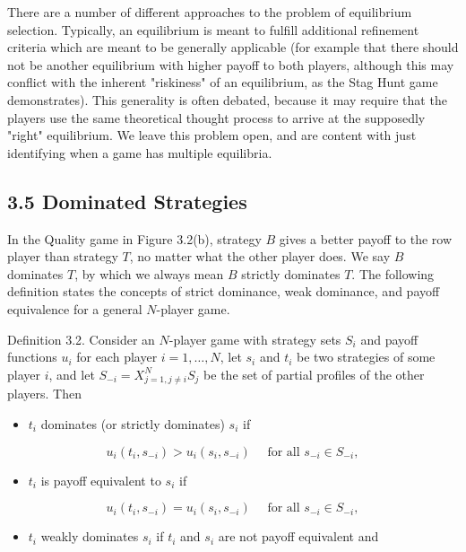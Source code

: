 \documentclass[12pt]{article}
\begin{document}
There are a number of different approaches to the problem of equilibrium selection. Typically, an equilibrium is meant to fulfill additional refinement criteria which are meant to be generally applicable (for example that there should not be another equilibrium with higher payoff to both players, although this may conflict with the inherent "riskiness" of an equilibrium, as the Stag Hunt game demonstrates). This generality is often debated, because it may require that the players use the same theoretical thought process to arrive at the supposedly "right" equilibrium. We leave this problem open, and are content with just identifying when a game has multiple equilibria.

\subsection*{3.5 Dominated Strategies}
In the Quality game in Figure 3.2(b), strategy $B$ gives a better payoff to the row player than strategy $T$, no matter what the other player does. We say $B$ dominates $T$, by which we always mean $B$ strictly dominates $T$. The following definition states the concepts of strict dominance, weak dominance, and payoff equivalence for a general $N$-player game.

Definition 3.2. Consider an $N$-player game with strategy sets $S_{i}$ and payoff functions $u_{i}$ for each player $i=1, \ldots, N$, let $s_{i}$ and $t_{i}$ be two strategies of some player $i$, and let $S_{-i}=X_{j=1, j \neq i}^{N} S_{j}$ be the set of partial profiles of the other players. Then

\begin{itemize}
  \item $t_{i}$ dominates (or strictly dominates) $s_{i}$ if
\end{itemize}


\begin{equation*}
u_{i}\left(t_{i}, s_{-i}\right)>u_{i}\left(s_{i}, s_{-i}\right) \quad \text { for all } s_{-i} \in S_{-i}, \tag{3.4}
\end{equation*}


\begin{itemize}
  \item $t_{i}$ is payoff equivalent to $s_{i}$ if
\end{itemize}

$$
u_{i}\left(t_{i}, s_{-i}\right)=u_{i}\left(s_{i}, s_{-i}\right) \quad \text { for all } s_{-i} \in S_{-i},
$$

\begin{itemize}
  \item $t_{i}$ weakly dominates $s_{i}$ if $t_{i}$ and $s_{i}$ are not payoff equivalent and
\end{itemize}
\end{document}
